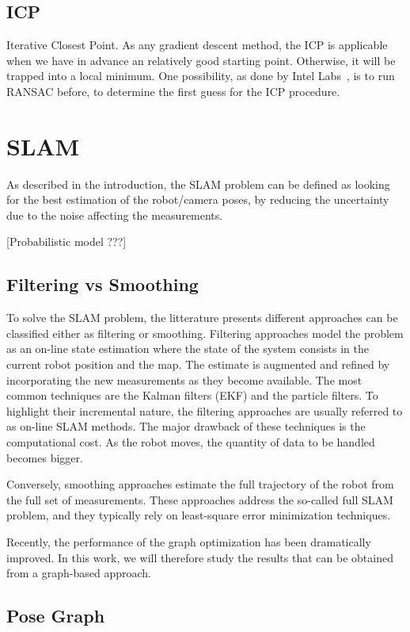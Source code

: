 \subsection{ICP}
Iterative Closest Point. As any gradient descent method, the ICP is applicable when we have in advance an relatively good starting point. Otherwise, it will be trapped into a local minimum. One possibility, as done by Intel Labs~\cite{IntelRGBD2010}, is to run RANSAC before, to determine the first guess for the ICP procedure.

\section{SLAM}

As described in the introduction, the SLAM problem can be defined as looking for the best estimation of the robot/camera poses, by reducing the uncertainty due to the noise affecting the measurements.

[Probabilistic model ???]

\subsection{Filtering vs Smoothing}

To solve the SLAM problem, the litterature presents different approaches can be classified either as filtering or smoothing. Filtering approaches model the problem as an on-line state estimation where the state of the system consists in the current robot position and the map. The estimate is augmented and refined by incorporating the new measurements as they become available.
The most common techniques are the Kalman filters (EKF) and the particle filters. To highlight their incremental nature, the filtering approaches are usually referred to as on-line SLAM methods.
The major drawback of these techniques is the computational cost. As the robot moves, the quantity of data to be handled becomes bigger.

Conversely, smoothing approaches estimate the full trajectory of the robot from the full set of measurements. These approaches address the so-called full SLAM problem, and they typically rely on least-square error minimization techniques.

Recently, the performance of the graph optimization has been dramatically improved. In this work, we will therefore study the results that can be obtained from a graph-based approach.

\subsection{Pose Graph}

